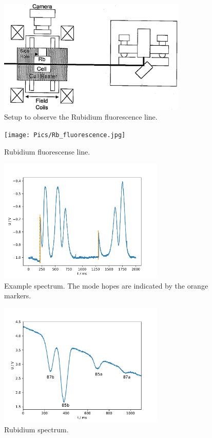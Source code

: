 \begin{figure}
  \centering
  \includegraphics[width=0.8\textwidth]{Pics/setup_fluorescence.png}
  \caption{Setup to observe the Rubidium fluorescence line.\cite{anleitung}}
  \label{fig:setup_fluorescence}
\end{figure}

\begin{figure}
  \centering
  \texttt{[image: Pics/Rb\_fluorescence.jpg]}
  \caption{Rubidium fluorescense line.}
  \label{fig:fluorescence}
\end{figure}



\begin{figure}
  \centering
  \includegraphics[width=0.7\textwidth]{Pics/example_spectrum_hop.pdf}
  \caption{Example spectrum. The mode hopes are indicated by the orange markers.}
  \label{fig:example}
\end{figure}

\begin{figure}
  \centering
  \includegraphics[width=0.7\textwidth]{Pics/Rb_spectrum.pdf}
  \caption{Rubidium spectrum.}
  \label{fig:spectrum}
\end{figure}

